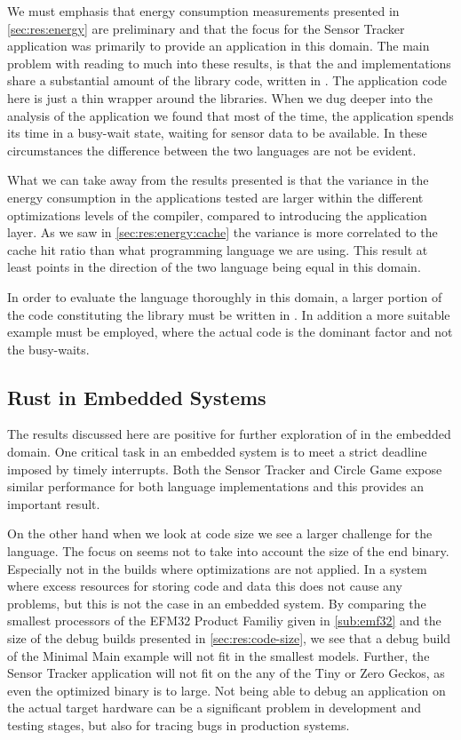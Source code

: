 We must emphasis that energy consumption measurements presented in \autoref{sec:res:energy} are preliminary and that the focus for the Sensor Tracker application was primarily to provide an application in this domain.
The main problem with reading to much into these results, is that the {\rust} and {\C} implementations share a substantial amount of the library code, written in {\C}.
The application code here is just a thin wrapper around the libraries.
When we dug deeper into the analysis of the application we found that most of the time, the application spends its time in a busy-wait state, waiting for sensor data to be available.
In these circumstances the difference between the two languages are not be evident.

What we can take away from the results presented is that the variance in the energy consumption in the applications tested are larger within the different optimizations levels of the {\C} compiler, compared to introducing the {\rust} application layer.
As we saw in \autoref{sec:res:energy:cache} the variance is more correlated to the cache hit ratio than what programming language we are using.
This result at least points in the direction of the two language being equal in this domain.

In order to evaluate the {\rust} language thoroughly in this domain, a larger portion of the code constituting the library must be written in {\rust}.
In addition a more suitable example must be employed, where the actual code is the dominant factor and not the busy-waits.

\subsection{Rust in Embedded Systems}

The results discussed here are positive for further exploration of {\rust} in the embedded domain.
One critical task in an embedded system is to meet a strict deadline imposed by timely interrupts.
Both the Sensor Tracker and Circle Game expose similar performance for both language implementations and this provides an important result.

On the other hand when we look at code size we see a larger challenge for the {\rust} language.
The focus on  seems not to take into account the size of the end binary.
Especially not in the builds where optimizations are not applied.
In a system where excess resources for storing code and data this does not cause any problems, but this is not the case in an embedded system.
By comparing the smallest processors of the EFM32 Product Familiy given in \autoref{sub:emf32} and the size of the debug builds presented in \autoref{sec:res:code-size}, we see that a debug build of the Minimal Main example will not fit in the smallest models.
Further, the Sensor Tracker application will not fit on the any of the Tiny or Zero Geckos, as even the optimized binary is to large.
Not being able to debug an application on the actual target hardware can be a significant problem in development and testing stages, but also for tracing bugs in production systems.
